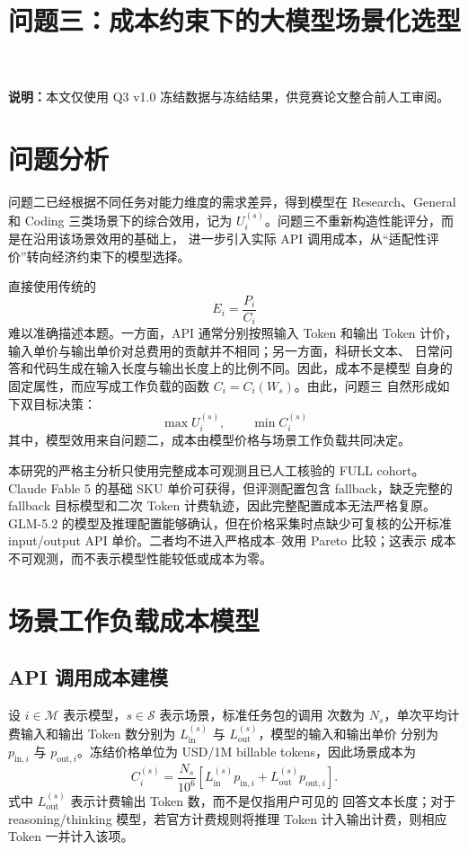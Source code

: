 \documentclass[UTF8,a4paper,11pt]{ctexart}
\title{\heiti 问题三：成本约束下的大模型场景化选型}
\author{}
\date{}
\begin{document}
\maketitle
\vspace{-1.5em}

\begin{center}
\small
\textbf{说明：}本文仅使用 Q3 v1.0 冻结数据与冻结结果，供竞赛论文整合前人工审阅。
\end{center}

\section{问题分析}

问题二已经根据不同任务对能力维度的需求差异，得到模型在
Research、General 和 Coding 三类场景下的综合效用，记为
$U_i^{(s)}$。问题三不重新构造性能评分，而是在沿用该场景效用的基础上，
进一步引入实际 API 调用成本，从“适配性评价”转向经济约束下的模型选择。

直接使用传统的
\[
E_i=\frac{P_i}{C_i}
\]
难以准确描述本题。一方面，API 通常分别按照输入 Token 和输出 Token
计价，输入单价与输出单价对总费用的贡献并不相同；另一方面，科研长文本、
日常问答和代码生成在输入长度与输出长度上的比例不同。因此，成本不是模型
自身的固定属性，而应写成工作负载的函数 $C_i=C_i(W_s)$。由此，问题三
自然形成如下双目标决策：
\[
\boxed{\qquad \max U_i^{(s)},\qquad \min C_i^{(s)}\qquad}
\]
其中，模型效用来自问题二，成本由模型价格与场景工作负载共同决定。

本研究的严格主分析只使用完整成本可观测且已人工核验的 FULL cohort。
Claude Fable 5 的基础 SKU 单价可获得，但评测配置包含 fallback，缺乏完整的
fallback 目标模型和二次 Token 计费轨迹，因此完整配置成本无法严格复原。
GLM-5.2 的模型及推理配置能够确认，但在价格采集时点缺少可复核的公开标准
input/output API 单价。二者均不进入严格成本--效用 Pareto 比较；这表示
成本不可观测，而不表示模型性能较低或成本为零。

\section{场景工作负载成本模型}

\subsection{API 调用成本建模}

设 $i\in\mathcal M$ 表示模型，$s\in\mathcal S$ 表示场景，标准任务包的调用
次数为 $N_s$，单次平均计费输入和输出 Token 数分别为
$L_{\mathrm{in}}^{(s)}$ 与 $L_{\mathrm{out}}^{(s)}$，模型的输入和输出单价
分别为 $p_{\mathrm{in},i}$ 与 $p_{\mathrm{out},i}$。冻结价格单位为
USD/1M billable tokens，因此场景成本为
\begin{equation}
C_i^{(s)}
=\frac{N_s}{10^6}
\left[
L_{\mathrm{in}}^{(s)}p_{\mathrm{in},i}
+L_{\mathrm{out}}^{(s)}p_{\mathrm{out},i}
\right].
\label{eq:cost}
\end{equation}
式中 $L_{\mathrm{out}}^{(s)}$ 表示计费输出 Token 数，而不是仅指用户可见的
回答文本长度；对于 reasoning/thinking 模型，若官方计费规则将推理 Token
计入输出计费，则相应 Token 一并计入该项。
\end{document}
